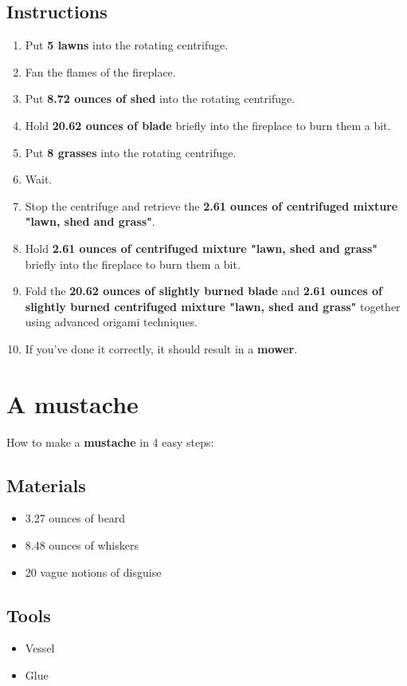 \documentclass{article}
\begin{document}
\subsection{Instructions}\begin{enumerate}
\item 
Put \textbf{5 lawns} into the rotating centrifuge.
\item 
Fan the flames of the fireplace.
\item 
Put \textbf{8.72 ounces of shed} into the rotating centrifuge.
\item 
Hold \textbf{20.62 ounces of blade} briefly into the fireplace to burn them a bit.
\item 
Put \textbf{8 grasses} into the rotating centrifuge.
\item 
Wait.
\item 
Stop the centrifuge and retrieve the \textbf{2.61 ounces of centrifuged mixture "lawn, shed and grass"}.
\item 
Hold \textbf{2.61 ounces of centrifuged mixture "lawn, shed and grass"} briefly into the fireplace to burn them a bit.
\item 
Fold the \textbf{20.62 ounces of slightly burned blade} and \textbf{2.61 ounces of slightly burned centrifuged mixture "lawn, shed and grass"} together using advanced origami techniques.
\item 
If you've done it correctly, it should result in a \textbf{mower}.
\end{enumerate}
\newpage
\section{A mustache}How to make a \textbf{mustache} in 4 easy steps:

\subsection{Materials}\begin{itemize}
\item 
3.27 ounces of beard
\item 
8.48 ounces of whiskers
\item 
20 vague notions of disguise
\end{itemize}
\subsection{Tools}\begin{itemize}
\item 
Vessel
\item 
Glue
\end{itemize}
\end{document}
